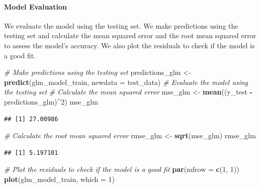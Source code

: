 \documentclass[
]{article}
\newenvironment{Shaded}{\begin{snugshade}}{\end{snugshade}}
\newcommand{\AttributeTok}[1]{\textcolor[rgb]{0.13,0.29,0.53}{#1}}
\newcommand{\CommentTok}[1]{\textcolor[rgb]{0.56,0.35,0.01}{\textit{#1}}}
\newcommand{\DecValTok}[1]{\textcolor[rgb]{0.00,0.00,0.81}{#1}}
\newcommand{\FunctionTok}[1]{\textcolor[rgb]{0.13,0.29,0.53}{\textbf{#1}}}
\newcommand{\NormalTok}[1]{#1}
\newcommand{\OtherTok}[1]{\textcolor[rgb]{0.56,0.35,0.01}{#1}}
\newcommand{\SpecialCharTok}[1]{\textcolor[rgb]{0.81,0.36,0.00}{\textbf{#1}}}
\begin{document}
\paragraph{Model Evaluation}\label{model-evaluation-1}

We evaluate the model using the testing set. We make predictions using
the testing set and calculate the mean squared error and the root mean
squared error to assess the model's accuracy. We also plot the residuals
to check if the model is a good fit.

\begin{Shaded}
\begin{Highlighting}[]
\CommentTok{\# Make predictions using the testing set}
\NormalTok{predictions\_glm }\OtherTok{\textless{}{-}} \FunctionTok{predict}\NormalTok{(glm\_model\_train, }\AttributeTok{newdata =}\NormalTok{ test\_data)}
\CommentTok{\# Evaluate the model using the testing set}
\CommentTok{\# Calculate the mean squared error}
\NormalTok{mse\_glm }\OtherTok{\textless{}{-}} \FunctionTok{mean}\NormalTok{((y\_test }\SpecialCharTok{{-}}\NormalTok{ predictions\_glm)}\SpecialCharTok{\^{}}\DecValTok{2}\NormalTok{)}
\NormalTok{mse\_glm}
\end{Highlighting}
\end{Shaded}

\begin{verbatim}
## [1] 27.00986
\end{verbatim}

\begin{Shaded}
\begin{Highlighting}[]
\CommentTok{\# Calculate the root mean squared error}
\NormalTok{rmse\_glm }\OtherTok{\textless{}{-}} \FunctionTok{sqrt}\NormalTok{(mse\_glm)}
\NormalTok{rmse\_glm}
\end{Highlighting}
\end{Shaded}

\begin{verbatim}
## [1] 5.197101
\end{verbatim}

\begin{Shaded}
\begin{Highlighting}[]
\CommentTok{\# Plot the residuals to check if the model is a good fit}
\FunctionTok{par}\NormalTok{(}\AttributeTok{mfrow =} \FunctionTok{c}\NormalTok{(}\DecValTok{1}\NormalTok{, }\DecValTok{1}\NormalTok{))}
\FunctionTok{plot}\NormalTok{(glm\_model\_train, }\AttributeTok{which =} \DecValTok{1}\NormalTok{)}
\end{Highlighting}
\end{Shaded}
\end{document}

